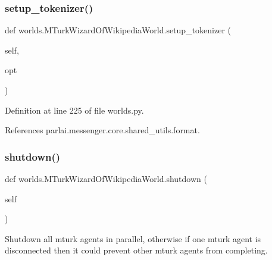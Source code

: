 \mbox{\label{classworlds_1_1MTurkWizardOfWikipediaWorld_adeec00a2a46a1bebabc3d57d16ec5ac9}} 
\subsubsection{\texorpdfstring{setup\+\_\+tokenizer()}{setup\_tokenizer()}}
{\footnotesize\ttfamily def worlds.\+M\+Turk\+Wizard\+Of\+Wikipedia\+World.\+setup\+\_\+tokenizer (\begin{DoxyParamCaption}\item[{}]{self,  }\item[{}]{opt }\end{DoxyParamCaption})}



Definition at line 225 of file worlds.\+py.



References parlai.\+messenger.\+core.\+shared\+\_\+utils.\+format.

\mbox{\label{classworlds_1_1MTurkWizardOfWikipediaWorld_a1667562badf2e1b2d77004fd400dabb3}} 
\subsubsection{\texorpdfstring{shutdown()}{shutdown()}}
{\footnotesize\ttfamily def worlds.\+M\+Turk\+Wizard\+Of\+Wikipedia\+World.\+shutdown (\begin{DoxyParamCaption}\item[{}]{self }\end{DoxyParamCaption})}

\begin{DoxyVerb}Shutdown all mturk agents in parallel, otherwise if one mturk agent
is disconnected then it could prevent other mturk agents from
completing.
\end{DoxyVerb}
 

